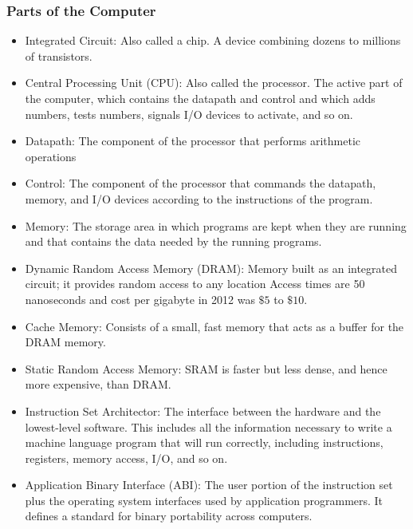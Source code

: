 \documentclass[10pt]{article}
\begin{document}
\subsubsection{Parts of the Computer}
\begin{itemize}
\item Integrated Circuit: Also called a chip. A device combining dozens to millions of transistors.
\item Central Processing Unit (CPU): Also called the processor. The active part of the computer, which contains the datapath and control and which adds numbers, tests numbers, signals I/O devices to activate, and so on.
\item Datapath: The component of the processor that performs arithmetic operations
\item Control: The component of the processor that commands the datapath, memory, and I/O devices according to the instructions of the program.
\item Memory: The storage area in which programs are kept when they are running and that contains the data needed by the running programs.
\item Dynamic Random Access Memory (DRAM): Memory built as an integrated circuit; it provides random access to any location Access times are 50 nanoseconds and cost per gigabyte in 2012 was $\$5$ to $\$10$.
\item Cache Memory: Consists of a small, fast memory that acts as a buffer for the DRAM memory.
\item Static Random Access Memory: SRAM is faster but less dense, and hence more expensive, than DRAM.
\item Instruction Set Architector: The interface between the hardware and the lowest-level software.  This includes all the information necessary to write a machine language program that will run correctly, including instructions, registers, memory access, I/O, and so on.
\item Application Binary Interface (ABI): The user portion of the instruction set plus the operating system interfaces used by application programmers. It defines a standard for binary portability across computers. 
\end{itemize}
\addtocounter{subsection}{1}
\end{document}
